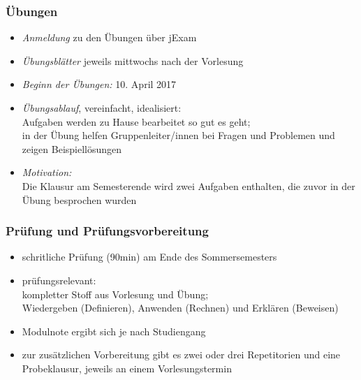 \documentclass[onlymath]{beamer}
\begin{document}
\begin{frame}\frametitle{Übungen}
\begin{itemize}
\item \emph{Anmeldung} zu den Übungen über jExam
\item \emph{Übungsblätter} jeweils mittwochs nach der Vorlesung
\item \emph{Beginn der Übungen:} 10. April 2017
\item \emph{Übungsablauf}, vereinfacht, idealisiert:\\
	Aufgaben werden zu Hause bearbeitet so gut es geht;\\
	in der Übung helfen Gruppenleiter/innen bei Fragen und Problemen und zeigen Beispiellösungen\pause\\[1ex]
\item \emph{Motivation:}\\
	Die Klausur am Semesterende wird zwei Aufgaben enthalten, die zuvor in der Übung
	besprochen wurden
\end{itemize}

\end{frame}


\begin{frame}\frametitle{Prüfung und Prüfungsvorbereitung}
\begin{itemize}
\item schritliche Prüfung (90min) am Ende des Sommersemesters
\item prüfungsrelevant:\\
	kompletter Stoff aus Vorlesung \alert{und} Übung;\\
	Wiedergeben (Definieren), Anwenden (Rechnen) und Erklären (Beweisen)
\item Modulnote ergibt sich je nach Studiengang
\item zur zusätzlichen Vorbereitung gibt es \alert{zwei oder drei Repetitorien} und \alert{eine Probeklausur}, jeweils an einem Vorlesungstermin
\end{itemize}

\end{frame}
\end{document}
